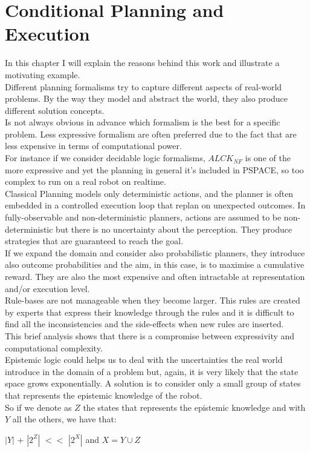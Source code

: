 \documentclass[pdftex,12pt,a4paper]{report}
\begin{document}
\chapter{Conditional Planning and Execution}\label{sec:approach}
In this chapter I will explain the reasons behind this work and illustrate a motivating example.\\
\newline
\noindent Different planning formalisms try to capture different aspects of real-world problems. By the way they model and abstract the world, they also produce different solution concepts.\\
Is not always obvious in advance which formalism is the best for a specific problem. Less expressive formalism are often preferred due to the fact that are less expensive in terms of computational power.\\
For instance if we consider decidable logic formalisms, $ALCK_{NF}$ is one of the more expressive and yet the planning in general it's included in PSPACE, so too complex to run on a real robot on realtime.\\ 
Classical Planning models only deterministic actions, and the planner is often embedded in a controlled execution loop that replan on unexpected outcomes. In fully-observable and non-deterministic planners, actions are assumed to be non-deterministic but there is no uncertainty about the perception. They produce strategies that are guaranteed to reach the goal. \\
If we expand the domain and consider also probabilistic planners, they introduce also outcome probabilities and the aim, in this case, is to maximise a cumulative reward. They are also the most expensive and often intractable at representation and/or execution level. \\
Rule-bases are not manageable when they become larger. This rules are created by experts that express their knowledge through the rules and it is difficult to find all the inconsistencies and the side-effects when new rules are inserted.\\
This brief analysis shows that there is a compromise between expressivity and computational complexity. \\ 
Epistemic logic could helps us to deal with the uncertainties the real world introduce in the domain of a problem but, again, it is very likely that the state space grows exponentially. A solution is to consider only a small group of states that represents the epistemic knowledge of the robot.\\
So if we denote as $Z$ the states that represents the epistemic knowledge and with $Y$ all the others, we have that:
\begin{center}
$|Y|$ + $|2^Z|$ $<<$ $|2^X|$ and $X = Y \cup Z$
\end{center}
\end{document}

